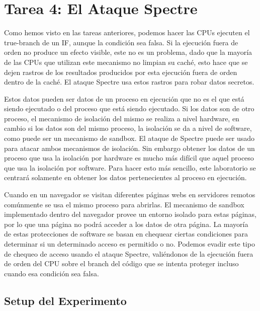 \section{Tarea 4: El Ataque Spectre}

Como hemos visto en las tareas anteriores, podemos hacer las CPUs ejecuten el true-branch de un IF, aunque la condición sea falsa. Si la ejecución fuera de orden no produce un efecto visible, este no es un problema, dado que la mayoría de las CPUs que utilizan este mecanismo no limpian su caché, esto hace que se dejen rastros de los resultados producidos por esta ejecución fuera de orden dentro de la caché. El ataque Spectre usa estos rastros para robar datos secretos.

Estos datos pueden ser datos de un proceso en ejecución que no es el que está siendo ejecutado o del proceso que está siendo ejecutado. Si los datos son de otro proceso, el mecanismo de isolación del mismo se realiza a nivel hardware, en cambio si los datos son del mismo proceso, la isolación se da a nivel de software, como puede ser un mecanismo de sandbox.
El ataque de Spectre puede ser usado para atacar ambos mecanismos de isolación.
Sin embargo obtener los datos de un proceso que usa la isolación por hardware es mucho más difícil que aquel proceso que usa la isolación por software. 
Para hacer esto más sencillo, este laboratorio se centrará solamente en obtener los datos pertenecientes al proceso en ejecución.

Cuando en un navegador se visitan diferentes páginas webs en servidores remotos comúnmente se usa el mismo proceso para abrirlas. El mecanismo de sandbox implementado dentro del navegador provee un entorno isolado para estas páginas, por lo que una página no podrá acceder a los datos de otra página.
La mayoría de estas protecciones de software se basan en chequear ciertas condiciones para determinar si un determinado acceso es permitido o no. 
Podemos evadir este tipo de chequeo de acceso usando el ataque Spectre, valiéndonos de la ejecución fuera de orden del CPU sobre el branch del código que se intenta proteger incluso cuando esa condición sea falsa.


\subsection{Setup del Experimento} 


